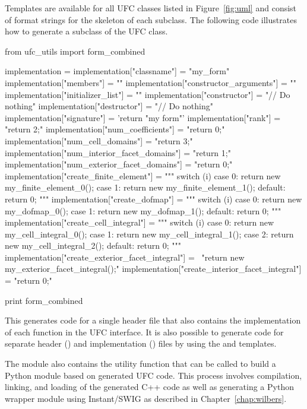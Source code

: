 Templates are available for all UFC classes listed in
Figure~\ref{fig:uml} and consist of format strings for the skeleton of
each subclass. The following code illustrates how to generate a
subclass of the UFC  class.

\begin{python}
from ufc_utils import form_combined

implementation = {}
implementation["classname"] = "my_form"
implementation["members"] = ""
implementation["constructor_arguments"] = ""
implementation["initializer_list"] = ""
implementation["constructor"] = "// Do nothing"
implementation["destructor"] = "// Do nothing"
implementation["signature"] = 'return "my form"'
implementation["rank"] = "return 2;"
implementation["num_coefficients"] = "return 0;"
implementation["num_cell_domains"] = "return 3;"
implementation["num_interior_facet_domains"] = "return 1;"
implementation["num_exterior_facet_domains"] = "return 0;"
implementation["create_finite_element"] = """
switch (i)
{
case 0:
  return new my_finite_element_0();
case 1:
  return new my_finite_element_1();
default:
  return 0;
}"""
implementation["create_dofmap"] = """
switch (i)
{
case 0:
  return new my_dofmap_0();
case 1:
  return new my_dofmap_1();
default:
  return 0;
}"""
implementation["create_cell_integral"] = """
switch (i)
{
case 0:
  return new my_cell_integral_0();
case 1:
  return new my_cell_integral_1();
case 2:
  return new my_cell_integral_2();
default:
  return 0;
}"""
implementation["create_exterior_facet_integral"] = \
    "return new my_exterior_facet_integral();"
implementation["create_interior_facet_integral"] = "return 0;"

print form_combined %
\end{python}

This generates code for a single header file that also contains the
implementation of each function in the UFC \emp{form} interface. It is
also possible to generate code for separate header (\emp{.h}) and
implementation (\emp{.cpp}) files by using the \emp{form\_header} and
\emp{form\_implementation} templates.

The  module also contains the utility function
 that can be called to build a Python module
based on generated UFC code. This process involves compilation,
linking, and loading of the generated C++ code as well as generating a
Python wrapper module using Instant/SWIG as described in
Chapter~\ref{chap:wilbers}.

